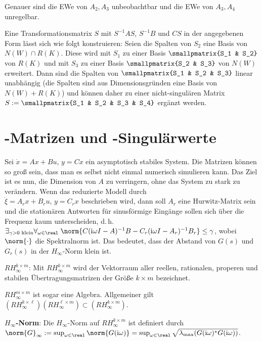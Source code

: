 Genauer sind die EWe von $A_2, A_3$ unbeobachtbar und die EWe von
$A_3, A_4$ unregelbar.

Eine Transformationsmatrix $S$ mit $S^{-1} AS$, $S^{-1} B$ und $CS$ in der angegebenen Form lässt
sich wie folgt konstruieren:
Seien die Spalten von $S_2$ eine Basis von $N(W) \cap R(K)$.
Diese wird mit $S_1$ zu einer Basis $\smallpmatrix{S_1 & S_2}$ von $R(K)$ und
mit $S_3$ zu einer Basis $\smallpmatrix{S_2 & S_3}$ von $N(W)$ erweitert.
Dann sind die Spalten von $\smallpmatrix{S_1 & S_2 & S_3}$ linear unabhängig
(die Spalten sind aus Dimensionsgründen eine Basis von $N(W) + R(K)$) und können daher zu einer
nicht-singulären Matrix $S := \smallpmatrix{S_1 & S_2 & S_3 & S_4}$ ergänzt werden.

\pagebreak

\section{%
    -Matrizen und -Singulärwerte%
}

Sei $\dot{x} = Ax + Bu$, $y = Cx$ ein asymptotisch stabiles System.
Die Matrizen können so groß sein, dass man es selbst nicht einmal numerisch simulieren kann.
Das Ziel ist es nun, die Dimension von $A$ zu verringern, ohne das System zu stark zu verändern.
Wenn das reduzierte Modell durch\\$\dot{\xi} = A_r x + B_r u$, $y = C_r x$ beschrieben wird,
dann soll $A_r$ eine Hurwitz-Matrix sein und die stationären Antworten für
sinusförmige Eingänge sollen sich über die Frequenz kaum unterscheiden, d.\,h.
$\exists_{\gamma > 0 \text{ klein}} \forall_{\omega \in \real}\;
\norm{C (\iu \omega I - A)^{-1} B - C_r (\iu \omega I - A_r)^{-1} B_r} \le \gamma$,
wobei $\norm{\cdot}$ die Spektralnorm ist.
Das bedeutet, dass der Abstand von $G(s)$ und $G_r(s)$ in der $H_\infty$-Norm klein ist.

\textbf{$RH_\infty^{k \times m}$}:
Mit $RH_\infty^{k \times m}$ wird der Vektorraum aller reellen, rationalen, properen und stabilen
Übertragungsmatrizen der Größe $k \times m$ bezeichnet.

$RH_\infty^{m \times m}$ ist sogar eine Algebra.
Allgemeiner gilt $(RH_\infty^{k \times \ell}) (RH_\infty^{\ell \times m}) \subset
(RH_\infty^{k \times m})$.

\textbf{$H_\infty$-Norm}:
Die $H_\infty$-Norm auf $RH_\infty^{k \times m}$ ist definiert durch\\
$\norm{G}_\infty := \sup_{\omega \in \real} \norm{G(\iu\omega)}
= \sup_{\omega \in \real} \sqrt{\lambda_{\max}(G(\iu\omega)^\ast G(\iu\omega))}$.

